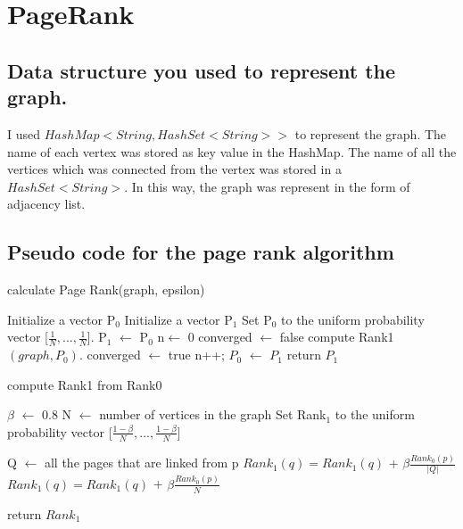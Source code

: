 \documentclass{article}
\begin{document}
\newpage

\section{PageRank}
\subsection{Data structure you used to represent the graph.}
I used $HashMap<String, HashSet<String>>$ to represent the graph. The name of each vertex was stored as key value in the HashMap. The name of all the vertices which was connected from the vertex was stored in a $HashSet<String>$. In this way, the graph was represent in the form of adjacency list.

\subsection{Pseudo code for the page rank algorithm}

\begin{algorithm}
\caption{calculate Page Rank(graph, epsilon)}
\begin{algorithmic}[1]
\State Initialize a vector P$_0$
\State Initialize a vector P$_1$
\State Set P$_0$ to the uniform probability vector [$\frac{1}{N}, ...,  \frac{1}{N}$].
\State P$_1$ $\gets$ P$_0$
\State n$\gets$ 0
\State converged $\gets$ false
\State compute Rank1 $(graph, P_0)$.
\State converged $\gets$ true
\EndIf
\State n++;
\State $P_0$ $\gets$ $P_1$
\EndWhile
\State return $P_1$
\EndProcedure
\end{algorithmic}
\end{algorithm}

\begin{algorithm}
\caption{compute Rank1 from Rank0}
\begin{algorithmic}[1]
\State $\beta$ $\gets$ 0.8
\State N $\gets$ number of vertices in the graph
\State Set Rank$_1$ to the uniform probability vector [$\frac{1-\beta}{N}, ...,  \frac{1-\beta}{N}$]

\State Q $\gets$ all the pages that are linked from p
\State $Rank_1(q) = Rank_1(q)$ + $\beta\frac{Rank_0(p)}{|Q|}$
\EndFor
\EndIf
{}
\State $Rank_1(q) = Rank_1(q)$ + $\beta\frac{Rank_0(p)}{N}$
\EndFor
\EndIf
\EndFor

\State return $Rank_1$
\EndProcedure
\end{algorithmic}
\end{algorithm}
\clearpage
\end{document}
